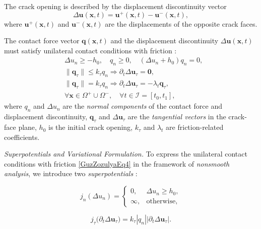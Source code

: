 The crack opening is described by the displacement discontinuity vector
\begin{equation}\label{GuzZozulyaEq3}
	\Delta \mathbf{u}(\mathbf{x},t) = \mathbf{u}^{+}(\mathbf{x},t) - \mathbf{u}^{-}(\mathbf{x},t),
\end{equation}
where $\mathbf{u}^{+}(\mathbf{x},t)$ and $\mathbf{u}^{-}(\mathbf{x},t)$ are the displacements of the opposite crack faces.

The contact force vector $\mathbf{q}(\mathbf{x},t)$ and the displacement discontinuity $\Delta \mathbf{u}(\mathbf{x},t)$ must satisfy unilateral contact conditions with friction \cite{GuzZozulyaRef5,GuzZozulyaRef20,GuzZozulyaRef26}:
\begin{equation}\label{GuzZozulyaEq4}
	\begin{aligned}
		& \Delta u_n \ge -h_0, \quad q_n \ge 0, \quad (\Delta u_n + h_0) q_n = 0, \\
		& \|\mathbf{q}_\tau\| \le k_\tau q_n \Rightarrow \partial_t \Delta \mathbf{u}_\tau = \mathbf{0}, \\
		& \|\mathbf{q}_\tau\| = k_\tau q_n \Rightarrow \partial_t \Delta \mathbf{u}_\tau = - \lambda_t \mathbf{q}_\tau, \\
		& \forall  \mathbf{x} \in \Omega^+\cup\Omega^-,\quad \forall  t\in\mathcal{I}=[t_0,t_1],
	\end{aligned}
\end{equation}
where
$q_n$ and $\Delta u_n$ are the \textit{normal components} of the contact force and displacement discontinuity,
$\mathbf{q}_\tau$ and $\Delta \mathbf{u}_\tau$ are the \textit{tangential vectors} in the crack-face plane,
$h_0$ is the initial crack opening,
$k_\tau$ and $\lambda_t$ are friction-related coefficients.

\medskip
\emph{Superpotentials and Variational Formulation.} To express the unilateral contact conditions with friction \eqref{GuzZozulyaEq4} in the framework of \emph{nonsmooth analysis},  
we introduce two \emph{superpotentials} \cite{GuzZozulyaRef6,GuzZozulyaRef26,GuzZozulyaRef30}:

\begin{equation}\label{GuzZozulyaEq5} %
	j_{n}(\Delta u_{n})=
	\begin{cases}
		0, & \Delta u_{n} \ge h_{0},\\
		\infty, & \text{otherwise},
	\end{cases}
\end{equation}

\begin{equation}\label{GuzZozulyaEq6} %
	j_{\tau} \bigl(\partial_t \Delta \mathbf{u}_{\tau}\bigr)=k_{\tau} |q_{n}| \bigl|\partial_t \Delta \mathbf{u}_{\tau}\bigr|.
\end{equation}

